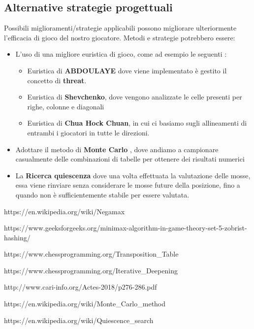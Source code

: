 \documentclass{article}
\begin{document}
\subsection{Alternative strategie progettuali}
Possibili miglioramenti/strategie applicabili possono migliorare ulteriormente l'efficacia di gioco del nostro giocatore. Metodi e strategie potrebbero essere:
\begin{itemize}
    \item L'uso di una migliore euristica di gioco, come ad esempio le seguenti \cite{cari}:
    \begin{itemize}
        \item Euristica di \textbf{ABDOULAYE}  dove viene implementato è gestito il concetto di \textbf{threat}.
        \item Euristica di \textbf{Shevchenko}, dove vengono analizzate le celle presenti per righe, colonne e diagonali
        \item Euristica di \textbf{Chua Hock Chuan}, in cui ci basiamo sugli allineamenti di entrambi i giocatori in tutte le direzioni.
    \end{itemize}
    \item Adottare il metodo di \textbf{Monte Carlo} \cite{Monte_Carlo_method}, dove andiamo a campionare casualmente delle combinazioni di tabelle per ottenere dei risultati numerici
    \item La \textbf{Ricerca quiescenza} \cite{Quiescence_search} dove una volta effettuata la valutazione delle mosse, essa viene rinviare senza considerare le mosse future della posizione, fino a quando non è sufficientemente stabile per essere valutata. 
\end{itemize}

\begin{thebibliography}{9}

https://en.wikipedia.org/wiki/Negamax

    https://www.geeksforgeeks.org/minimax-algorithm-in-game-theory-set-5-zobrist-hashing/

    https://www.chessprogramming.org/Transposition\_Table

 https://www.chessprogramming.org/Iterative\_Deepening

    http://www.cari-info.org/Actes-2018/p276-286.pdf

    https://en.wikipedia.org/wiki/Monte\_Carlo\_method

    https://en.wikipedia.org/wiki/Quiescence\_search
\end{thebibliography}
\end{document}
